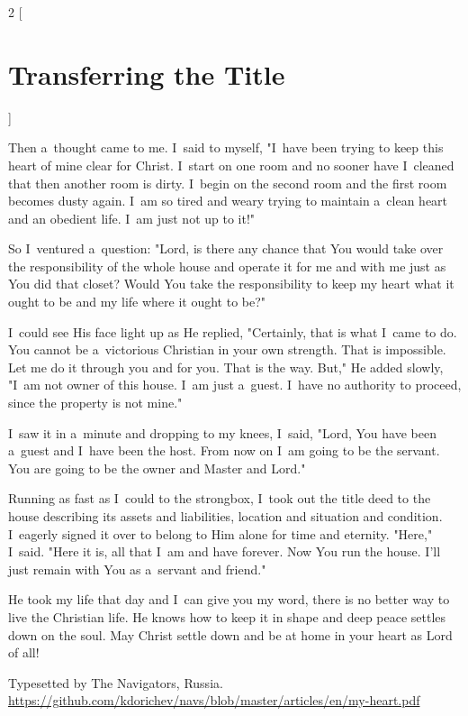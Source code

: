 \documentclass[a4paper,12pt]{article}
\begin{document}
\begin{multicols}{2}
    [
\section*{Transferring the Title}
    ]

Then a~thought came to me. I~said to myself, "I~have been trying to keep this heart of mine clear for Christ. I~start on one room and no sooner have I~cleaned that then another room is dirty. I~begin on the second room and the first room becomes dusty again. I~am so tired and weary trying to maintain a~clean heart and an obedient life. I~am just not up to it!" 

So I~ventured a~question: "Lord, is there any chance that You would take over the responsibility of the whole house and operate it for me and with me just as You did that closet? Would You take the responsibility to keep my heart what it ought to be and my life where it ought to be?" 

I~could see His face light up as He replied, "Certainly, that is what I~came to do. You cannot be a~victorious Christian in your own strength. That is impossible. Let me do it through you and for you. That is the way. But," He added slowly, "I~am not owner of this house. I~am just a~guest. I~have no authority to proceed, since the property is not mine." 

I~saw it in a~minute and dropping to my knees, I~said, "Lord, You have been a~guest and I~have been the host. From now on I~am going to be the servant. You are going to be the owner and Master and Lord." 

Running as fast as I~could to the strongbox, I~took out the title deed to the house describing its assets and liabilities, location and situation and condition. I~eagerly signed it over to belong to Him alone for time and eternity. "Here," I~said. "Here it is, all that I~am and have forever. Now You run the house. I'll just remain with You as a~servant and friend." 

He took my life that day and I~can give you my word, there is no better way to live the Christian life. He knows how to keep it in shape and deep peace settles down on the soul. May Christ settle down and be at home in your heart as Lord of all! 
\end{multicols}

\vfill
\noindent
{\small Typesetted by The Navigators, Russia.\\
\href{https://github.com/kdorichev/navs/blob/master/articles/en/my-heart.pdf}{https://github.com/kdorichev/navs/blob/master/articles/en/my-heart.pdf}
}
\end{document}
